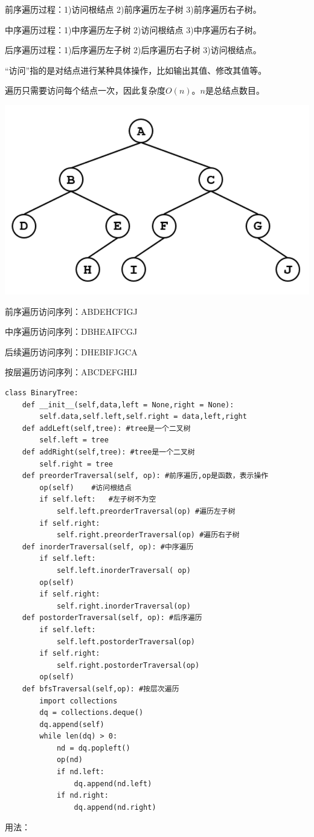 \documentclass[10pt,UTF8,a4paper]{ctexart}
\begin{document}
\begin{multicols}{3}
前序遍历过程：1)访问根结点 2)前序遍历左子树 3)前序遍历右子树。

中序遍历过程：1)中序遍历左子树 2)访问根结点 3)中序遍历右子树。

后序遍历过程：1)后序遍历左子树 2)后序遍历右子树 3)访问根结点。 

“访问”指的是对结点进行某种具体操作，比如输出其值、修改其值等。

遍历只需要访问每个结点一次，因此复杂度$O(n)$。$n$是总结点数目。

\includegraphics[width=.5\columnwidth]{images/二叉树的遍历.png}

前序遍历访问序列：ABDEHCFIGJ

中序遍历访问序列：DBHEAIFCGJ

后续遍历访问序列：DHEBIFJGCA

按层遍历访问序列：ABCDEFGHIJ

\begin{lstlisting}[style=python]
class BinaryTree:
	def __init__(self,data,left = None,right = None):
		self.data,self.left,self.right = data,left,right
	def addLeft(self,tree): #tree是一个二叉树
		self.left = tree
	def addRight(self,tree): #tree是一个二叉树
		self.right = tree
	def preorderTraversal(self, op): #前序遍历,op是函数，表示操作
		op(self)	#访问根结点
		if self.left:	#左子树不为空
			self.left.preorderTraversal(op) #遍历左子树
		if self.right:
			self.right.preorderTraversal(op) #遍历右子树
	def inorderTraversal(self, op): #中序遍历
		if self.left:
			self.left.inorderTraversal( op)
		op(self)
		if self.right:
			self.right.inorderTraversal(op)
	def postorderTraversal(self, op): #后序遍历
		if self.left:
			self.left.postorderTraversal(op)
		if self.right:
			self.right.postorderTraversal(op)
		op(self)
	def bfsTraversal(self,op): #按层次遍历
		import collections
		dq = collections.deque()
		dq.append(self)
		while len(dq) > 0:
			nd = dq.popleft()
			op(nd)
			if nd.left:
				dq.append(nd.left)
			if nd.right:
				dq.append(nd.right)

\end{lstlisting}

用法：


\end{multicols}
\end{document}

